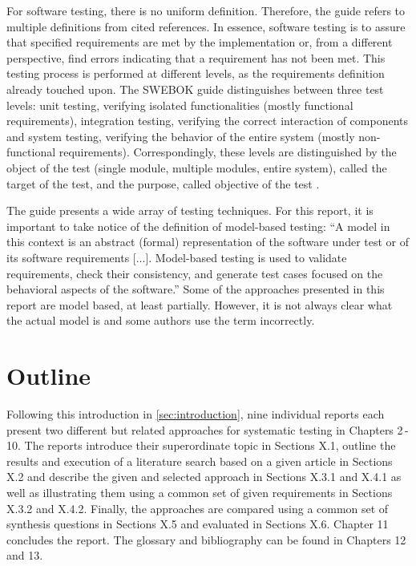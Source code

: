 For software testing, there is no uniform definition.
Therefore, the guide refers to multiple definitions from cited references.
In essence, software testing is to assure that specified requirements are met by the implementation or, from a different perspective, find errors indicating that a requirement has not been met.
This testing process is performed at different levels, as the requirements definition already touched upon.
The SWEBOK guide distinguishes between three test levels: unit testing, verifying isolated functionalities (mostly functional requirements), integration testing, verifying the correct interaction of components and system testing, verifying the behavior of the entire system (mostly non-functional requirements).
Correspondingly, these levels are distinguished by the object of the test (single module, multiple modules, entire system), called the target of the test, and the purpose, called objective of the test \cite{SWEBOK}.

The guide presents a wide array of testing techniques.
For this report, it is important to take notice of the definition of model-based testing: \enquote{A model in this context is an abstract (formal) representation of the software under test or of its software requirements [...].
Model-based testing is used to validate requirements, check their consistency, and generate test cases focused on the behavioral aspects of the software.}\cite{SWEBOK}
Some of the approaches presented in this report are model based, at least partially.
However, it is not always clear what the actual model is and some authors use the term incorrectly.

\section{Outline}
\label{sec:intruduction1.3}

Following this introduction in \autoref{sec:introduction}, nine individual reports each present two different but related approaches for systematic testing in Chapters 2\,-\,10.
The reports introduce their superordinate topic in Sections X.1, outline the results and execution of a literature search based on a given article in Sections X.2 and describe the given and selected approach in Sections X.3.1 and X.4.1 as well as illustrating them using a common set of given requirements in Sections X.3.2 and X.4.2.
Finally, the approaches are compared using a common set of synthesis questions in Sections X.5 and evaluated in Sections X.6.
Chapter 11 concludes the report.
The glossary and bibliography can be found in Chapters 12 and 13.\\

